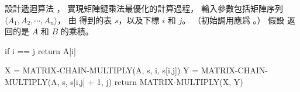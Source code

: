 \startEXERCISE
設計遞迴算法 ，
實現矩陣鏈乘法最優化的計算過程，
輸入參數包括矩陣序列 $\langle A_1, A_2, \cdots, A_n \rangle$，
由  得到的表 $s$，以及下標 $i$ 和 $j$。
（初始調用應爲 。）
假設  返回的是 $A$ 和 $B$ 的乘積。
\stopEXERCISE

\startANSWER
{}
\startCLRSCODE
if i == j
	return A[i]

X = MATRIX-CHAIN-MULTIPLY(A, s, i, s[i,j])
Y = MATRIX-CHAIN-MULTIPLY(A, s, s[i,j] + 1, j)
return MATRIX-MULTIPLY(X, Y)
\stopCLRSCODE
\stopANSWER
